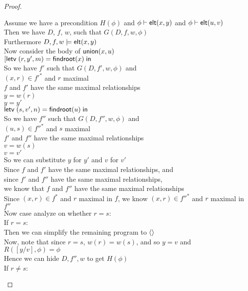\begin{proof}
\begin{tabbedproof}
\oo Assume we have a precondition $H(\phi)$ and ${\phi} \vdash \mathsf{elt}({x}, {y})$ and ${\phi} \vdash \mathsf{elt}({u}, {v})$\\
\ooo Then we have $D$, $f$, $w$, such that $G(D, f, w, \phi)$ \\
\ooo Furthermore $D, f, w \models \mathsf{elt}({x}, {y})$ \\
\ooo Now consider the body of $\mathsf{union}(x,u)$ \\
\ooo $[\mathsf{letv}\;(r,y',m) = \mathsf{findroot}(x)\;\mathsf{in}\;$ \\
\ooo So we have $f'$ such that $G(D, f', w, \phi)$ and \\
\ooox  $(x, r) \in f'^*$ and $r$ maximal \\
\ooox  $f$ and $f'$ have the same maximal relationships \\
\ooox  $y = w(r)$ \\
\ooox  $y = y'$ \\
\ooo $\mathsf{letv}\;(s,v',n) = \mathsf{findroot}(u)\;\mathsf{in}\;$ \\
\ooo So we have $f''$ such that $G(D, f'', w, \phi)$ and \\
\ooox  $(u, s) \in f''^*$ and $s$ maximal \\
\ooox  $f'$ and $f''$ have the same maximal relationships \\
\ooox  $v = w(s)$ \\
\ooox  $v = v'$ \\
\ooo So we can substitute $y$ for $y'$ and $v$ for $v'$ \\
\ooo Since $f$ and $f'$ have the same maximal relationships, and \\
\oox since $f'$ and $f''$ have the same maximal relationships,  \\
\oox we know that $f$ and $f''$ have the same maximal relationships \\
\ooo Since $(x,r) \in f^*$ and $r$ maximal in $f$, we know $(x, r) \in f''^*$ and $r$ maximal in $f''$ \\
\ooo Now case analyze on whether $r = s$: \\
\ooo If $r = s$: \\
\oooo Then we can simplify the remaining program to $\left<\right>$ \\
\oooo Now, note that since $r = s$, $w(r) = w(s)$, and so $y = v$ and $R([y/v], \phi) = \phi$ \\
\oooo Hence we can hide $D, f'', w$ to get $H(\phi)$ \\
\ooo If $r \not= s$: \\

\end{tabbedproof}
\end{proof}

